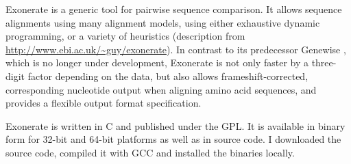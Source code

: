 Exonerate \citep{slater2005} is a generic tool for pairwise sequence comparison.
It allows sequence alignments using many alignment models, using either
exhaustive dynamic programming, or a variety of heuristics (description from
\url{http://www.ebi.ac.uk/~guy/exonerate}). In contrast to its predecessor
Genewise \citep{birney2004}, which is no longer under development, Exonerate is
not only faster by a three-digit factor depending on the data, but also allows
frameshift-corrected, corresponding nucleotide output when aligning amino acid
sequences, and provides a flexible output format specification.

Exonerate is written in C and published under the GPL. It is available in binary
form for 32-bit and 64-bit platforms as well as in source code. I downloaded the
source code, compiled it with GCC and installed the binaries locally.
